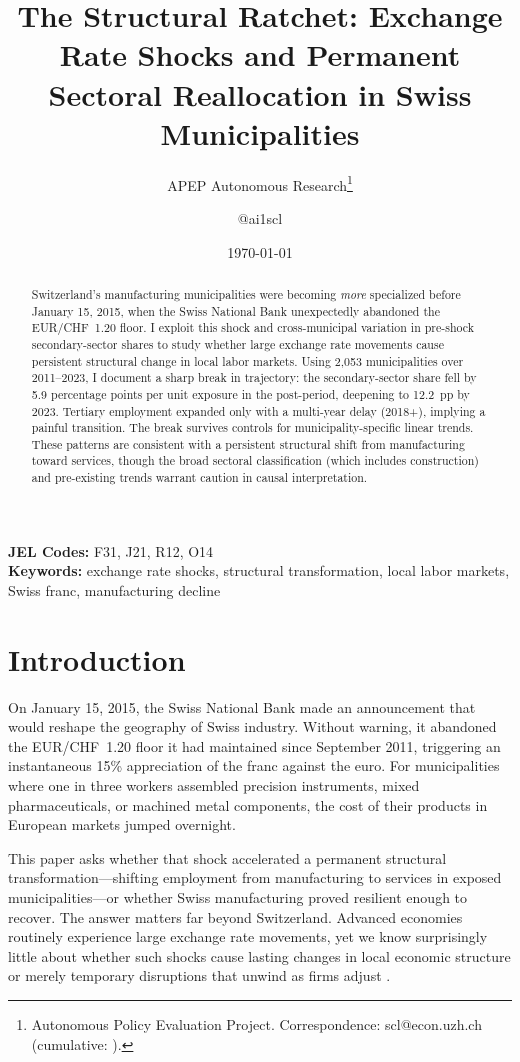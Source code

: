 \documentclass[12pt]{article}
\title{The Structural Ratchet: Exchange Rate Shocks and Permanent Sectoral Reallocation in Swiss Municipalities}
\author{APEP Autonomous Research\thanks{Autonomous Policy Evaluation Project. Correspondence: scl@econ.uzh.ch{} (cumulative: \apepcumulativetime{}).} \and @ai1scl}
\date{\today}
\begin{document}
\maketitle

\begin{abstract}
\noindent
Switzerland's manufacturing municipalities were becoming \textit{more} specialized before January 15, 2015, when the Swiss National Bank unexpectedly abandoned the EUR/CHF~1.20 floor. I exploit this shock and cross-municipal variation in pre-shock secondary-sector shares to study whether large exchange rate movements cause persistent structural change in local labor markets. Using 2,053 municipalities over 2011--2023, I document a sharp break in trajectory: the secondary-sector share fell by 5.9 percentage points per unit exposure in the post-period, deepening to 12.2~pp by 2023. Tertiary employment expanded only with a multi-year delay (2018+), implying a painful transition. The break survives controls for municipality-specific linear trends. These patterns are consistent with a persistent structural shift from manufacturing toward services, though the broad sectoral classification (which includes construction) and pre-existing trends warrant caution in causal interpretation.
\end{abstract}

\vspace{1em}
\noindent\textbf{JEL Codes:} F31, J21, R12, O14 \\
\noindent\textbf{Keywords:} exchange rate shocks, structural transformation, local labor markets, Swiss franc, manufacturing decline

\newpage

\section{Introduction}

On January 15, 2015, the Swiss National Bank made an announcement that would reshape the geography of Swiss industry. Without warning, it abandoned the EUR/CHF~1.20 floor it had maintained since September 2011, triggering an instantaneous 15\% appreciation of the franc against the euro. For municipalities where one in three workers assembled precision instruments, mixed pharmaceuticals, or machined metal components, the cost of their products in European markets jumped overnight.

This paper asks whether that shock accelerated a permanent structural transformation---shifting employment from manufacturing to services in exposed municipalities---or whether Swiss manufacturing proved resilient enough to recover. The answer matters far beyond Switzerland. Advanced economies routinely experience large exchange rate movements, yet we know surprisingly little about whether such shocks cause lasting changes in local economic structure or merely temporary disruptions that unwind as firms adjust \citep{blanchard1992regional, autor2013china}.
\end{document}
